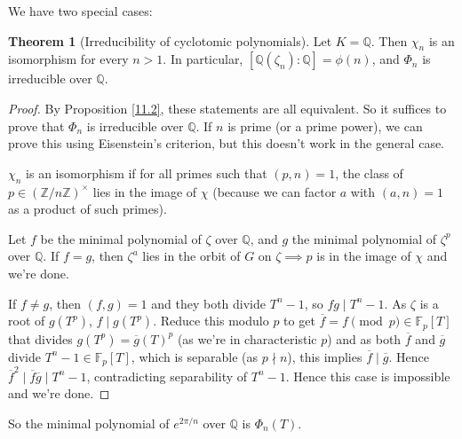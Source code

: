 \documentclass{article}
\theoremstyle{definition}
\newtheorem{theorem}{Theorem}[section]
\begin{document}
We have two special cases:
\begin{theorem}[Irreducibility of cyclotomic polynomials]
    Let $K=\mathbb{Q}$. Then $\chi_n$ is an isomorphism for every $n>1$. In particular, $[\mathbb{Q}(\zeta_n):\mathbb{Q}]=\phi(n)$, and $\Phi_n$ is irreducible over $\mathbb{Q}$.
\end{theorem}
\begin{proof}
    By Proposition \ref{11.2}, these statements are all equivalent. So it suffices to prove that $\Phi_n$ is irreducible over $\mathbb{Q}$. If $n$ is prime (or a prime power), we can prove this using Eisenstein's criterion, but this doesn't work in the general case.

    $\chi_n$ is an isomorphism if for all primes such that $(p,n)=1$, the class of $p \in (\mathbb{Z}/n\mathbb{Z})^\times$ lies in the image of $\chi$ (because we can factor $a$ with $(a,n)=1$ as a product of such primes).

    Let $f$ be the minimal polynomial of $\zeta$ over $\mathbb{Q}$, and $g$ the minimal polynomial of $\zeta^p$ over $\mathbb{Q}$. If $f=g$, then $\zeta^a$ lies in the orbit of $G$ on $\zeta \implies p$ is in the image of $\chi$ and we're done.

    If $f\neq g$, then $(f,g)=1$ and they both divide $T^n-1$, so $fg \mid T^n-1$. As $\zeta$ is a root of $g(T^p)$, $f \mid g(T^p)$. Reduce this modulo $p$ to get $\overline{f} = f \pmod{p} \in \mathbb{F}_p[T]$ that divides $g(T^p) = \overline{g}(T)^p$ (as we're in characteristic $p$) and as both $\overline{f}$ and $\overline{g}$ divide $T^n-1 \in \mathbb{F}_p[T]$, which is separable (as $p \nmid n$), this implies $\overline{f} \mid \overline{g}$. Hence $\overline{f}^2 \mid \overline{f}\overline{g} \mid T^n-1$, contradicting separability of $T^n-1$. Hence this case is impossible and we're done.
\end{proof}
So the minimal polynomial of $e^{2\pi/n}$ over $\mathbb{Q}$ is $\Phi_n(T)$.
\vspace{1mm}

\end{document}
